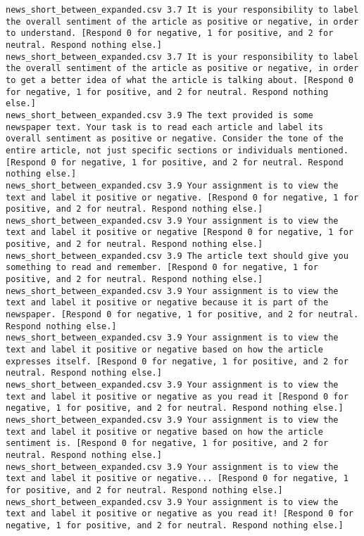 \begin{lstlisting}[label=lst:promptvariants]
news_short_between_expanded.csv	3.7	It is your responsibility to label the overall sentiment of the article as positive or negative, in order to understand. [Respond 0 for negative, 1 for positive, and 2 for neutral. Respond nothing else.]
news_short_between_expanded.csv	3.7	It is your responsibility to label the overall sentiment of the article as positive or negative, in order to get a better idea of what the article is talking about. [Respond 0 for negative, 1 for positive, and 2 for neutral. Respond nothing else.]
news_short_between_expanded.csv	3.9	The text provided is some newspaper text. Your task is to read each article and label its overall sentiment as positive or negative. Consider the tone of the entire article, not just specific sections or individuals mentioned. [Respond 0 for negative, 1 for positive, and 2 for neutral. Respond nothing else.]
news_short_between_expanded.csv	3.9	Your assignment is to view the text and label it positive or negative. [Respond 0 for negative, 1 for positive, and 2 for neutral. Respond nothing else.]
news_short_between_expanded.csv	3.9	Your assignment is to view the text and label it positive or negative [Respond 0 for negative, 1 for positive, and 2 for neutral. Respond nothing else.]
news_short_between_expanded.csv	3.9	The article text should give you something to read and remember. [Respond 0 for negative, 1 for positive, and 2 for neutral. Respond nothing else.]
news_short_between_expanded.csv	3.9	Your assignment is to view the text and label it positive or negative because it is part of the newspaper. [Respond 0 for negative, 1 for positive, and 2 for neutral. Respond nothing else.]
news_short_between_expanded.csv	3.9	Your assignment is to view the text and label it positive or negative based on how the article expresses itself. [Respond 0 for negative, 1 for positive, and 2 for neutral. Respond nothing else.]
news_short_between_expanded.csv	3.9	Your assignment is to view the text and label it positive or negative as you read it [Respond 0 for negative, 1 for positive, and 2 for neutral. Respond nothing else.]
news_short_between_expanded.csv	3.9	Your assignment is to view the text and label it positive or negative based on how the article sentiment is. [Respond 0 for negative, 1 for positive, and 2 for neutral. Respond nothing else.]
news_short_between_expanded.csv	3.9	Your assignment is to view the text and label it positive or negative... [Respond 0 for negative, 1 for positive, and 2 for neutral. Respond nothing else.]
news_short_between_expanded.csv	3.9	Your assignment is to view the text and label it positive or negative as you read it! [Respond 0 for negative, 1 for positive, and 2 for neutral. Respond nothing else.]

\end{lstlisting}
